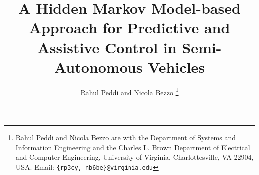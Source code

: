 \documentclass[letterpaper, 10 pt, conference]{ieeeconf}  %
\begin{document}
%
\title{\LARGE \bf A Hidden Markov Model-based Approach for Predictive and Assistive Control in Semi-Autonomous Vehicles}
\author{Rahul Peddi and Nicola Bezzo%
\thanks{Rahul Peddi and Nicola Bezzo are with the Department of Systems and Information Engineering and the Charles L. Brown Department of Electrical and Computer Engineering, University of Virginia, Charlottesville, VA 22904, USA. Email: {\tt \{rp3cy, nb6be\}@virginia.edu}}
}





\maketitle

\begin{abstract}
\end{abstract}





%
\IEEEpeerreviewmaketitle
\end{document}
